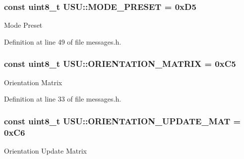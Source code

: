 \hypertarget{namespace_u_s_u_afc9a1298a3210c69931db151aaf35de7}{
\subsubsection[{\-M\-O\-D\-E\-\_\-\-P\-R\-E\-S\-E\-T}]{\setlength{\rightskip}{0pt plus 5cm}const uint8\-\_\-t {\bf \-U\-S\-U\-::\-M\-O\-D\-E\-\_\-\-P\-R\-E\-S\-E\-T} = 0x\-D5}}\label{namespace_u_s_u_afc9a1298a3210c69931db151aaf35de7}
\-Mode \-Preset 

\-Definition at line 49 of file messages.\-h.

\hypertarget{namespace_u_s_u_a6bab14d28c02be2a8956e98d18b9b275}{
\subsubsection[{\-O\-R\-I\-E\-N\-T\-A\-T\-I\-O\-N\-\_\-\-M\-A\-T\-R\-I\-X}]{\setlength{\rightskip}{0pt plus 5cm}const uint8\-\_\-t {\bf \-U\-S\-U\-::\-O\-R\-I\-E\-N\-T\-A\-T\-I\-O\-N\-\_\-\-M\-A\-T\-R\-I\-X} = 0x\-C5}}\label{namespace_u_s_u_a6bab14d28c02be2a8956e98d18b9b275}
\-Orientation \-Matrix 

\-Definition at line 33 of file messages.\-h.

\hypertarget{namespace_u_s_u_a9d3464edac1b198f5c02658b36d083bb}{
\subsubsection[{\-O\-R\-I\-E\-N\-T\-A\-T\-I\-O\-N\-\_\-\-U\-P\-D\-A\-T\-E\-\_\-\-M\-A\-T}]{\setlength{\rightskip}{0pt plus 5cm}const uint8\-\_\-t {\bf \-U\-S\-U\-::\-O\-R\-I\-E\-N\-T\-A\-T\-I\-O\-N\-\_\-\-U\-P\-D\-A\-T\-E\-\_\-\-M\-A\-T} = 0x\-C6}}\label{namespace_u_s_u_a9d3464edac1b198f5c02658b36d083bb}
\-Orientation \-Update \-Matrix 

